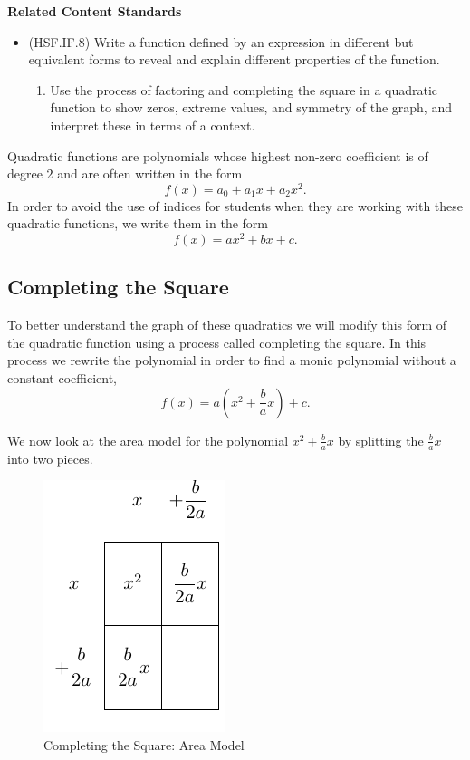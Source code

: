 \documentclass[
]{book}
\providecommand{\tightlist}{%
  \setlength{\itemsep}{0pt}\setlength{\parskip}{0pt}}
\newenvironment{standards}{}{}
\theoremstyle{definition}
\theoremstyle{definition}
\theoremstyle{definition}
\theoremstyle{definition}
\theoremstyle{remark}
\begin{document}
\begin{standards}

\begin{center}
\textbf{Related Content Standards}

\end{center}

\begin{itemize}
\tightlist
\item
  (HSF.IF.8) Write a function defined by an expression in different but equivalent forms to reveal and explain different properties of the function.

  \begin{enumerate}
  \def\labelenumi{\alph{enumi}.}
  \tightlist
  \item
    Use the process of factoring and completing the square in a quadratic function to show zeros, extreme values, and symmetry of the graph, and interpret these in terms of a context.
  \end{enumerate}
\end{itemize}

\end{standards}

Quadratic functions are polynomials whose highest non-zero coefficient is of degree \(2\) and are often written in the form \[f(x)=a_0 + a_1 x + a_2 x^2.\] In order to avoid the use of indices for students when they are working with these quadratic functions, we write them in the form
\[f(x)=ax^2 + bx +c.\]

\hypertarget{completing-the-square}{%
\subsection{Completing the Square}\label{completing-the-square}}

To better understand the graph of these quadratics we will modify this form of the quadratic function using a process called completing the square. In this process we rewrite the polynomial in order to find a monic polynomial without a constant coefficient,
\[f(x) = a \left( x^2 +\frac{b}{a}x \right) + c.\]

We now look at the area model for the polynomial \(x^2+\frac{b}{a}x\) by splitting the \(\frac{b}{a}x\) into two pieces.

\begin{figure}

{\centering \includegraphics[width=0.2\linewidth]{tikz/completing-square} 

}

\caption{Completing the Square: Area Model}\label{fig:unnamed-chunk-71}
\end{figure}
\end{document}
